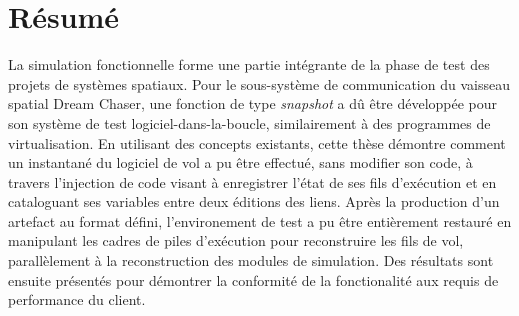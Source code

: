 \chapter*{Résumé}\label{cha:resume}
La simulation fonctionnelle forme une partie intégrante de la phase de test des projets de systèmes spatiaux. Pour le sous-système de communication du vaisseau spatial Dream Chaser, une fonction de type \textit{snapshot} a dû être développée pour son système de test logiciel-dans-la-boucle, similairement à des programmes de virtualisation. En utilisant des concepts existants, cette thèse démontre comment un instantané du logiciel de vol a pu être effectué, sans modifier son code, à travers l'injection de code visant à enregistrer l'état de ses fils d'exécution et en cataloguant ses variables entre deux éditions des liens. Après la production d'un artefact au format défini, l'environement de test a pu être entièrement restauré en manipulant les cadres de piles d'exécution pour reconstruire les fils de vol, parallèlement à la reconstruction des modules de simulation. Des résultats sont ensuite présentés pour démontrer la conformité de la fonctionalité aux requis de performance du client.